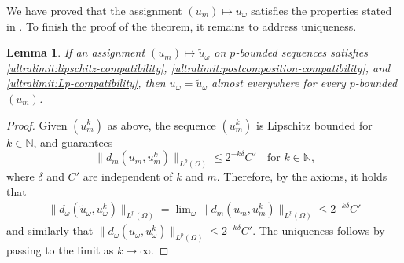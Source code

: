 \documentclass[a4paper,leqno]{amsart}
\numberwithin{equation}{section}
\newtheorem{lemma}[theorem]{Lemma}
\theoremstyle{remark}
\theoremstyle{remark}
\newcommand{\N}{\mathbb{N}}
\begin{document}
We have proved that the assignment $(u_m)\mapsto u_\omega$ satisfies the properties stated in . To finish the proof of the theorem, it remains to address uniqueness.
\begin{lemma}
If an assignment $(u_m) \mapsto \widetilde{u}_\omega$ on $p$-bounded sequences satisfies \eqref{ultralimit:lipschitz-compatibility}, \eqref{ultralimit:postcomposition-compatibility}, and \eqref{ultralimit:Lp-compatibility}, then $u_\omega = \widetilde{u}_\omega$ almost everywhere for every $p$-bounded $(u_m)$.
\end{lemma}
\begin{proof}
Given $( u_m^k )$ as above, the sequence $(u_m^k)$ is Lipschitz bounded for $k \in \N$, and  guarantees $$\|d_m(u_m, u_m^k)\|_{L^p(\Omega)}\leq 2^{-k\delta}C' \quad\text{for $k \in \N$,}$$ where $\delta$ and $C'$ are independent of $k$ and $m$. Therefore, by the axioms, it holds that
\begin{align*}
    \| d_\omega( \tilde{u}_\omega, u_\omega^k ) \|_{ L^{p}(\Omega) }
    =
    \lim\nolimits_\omega 
    \|d_m(u_m, u_m^k)\|_{L^p(\Omega)}\leq 2^{-k\delta}C'
\end{align*}
and similarly that $\| d_\omega( u_\omega, u_\omega^k ) \|_{ L^{p}(\Omega) } \leq 2^{-k\delta}C'$. The uniqueness follows by passing to the limit as $k \to \infty$.
\end{proof}
\end{document}
